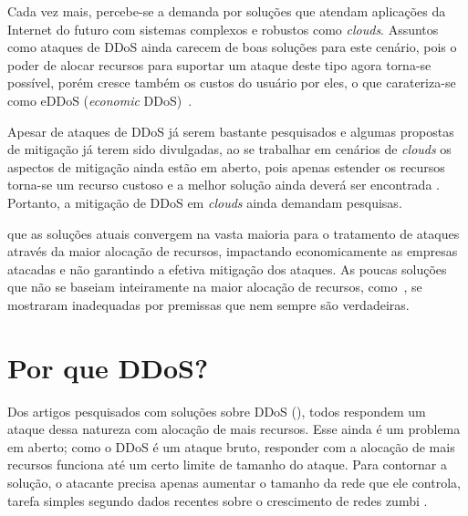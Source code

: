 \documentclass[a4paper, 11pt]{article}
\begin{document}




Cada vez mais, percebe-se a demanda por solu\c{c}\~oes que atendam
aplica\c{c}\~oes da Internet do futuro com sistemas complexos e robustos como
\emph{clouds}. Assuntos como ataques de DDoS ainda carecem de boas
solu\c{c}\~oes para este cen\'ario, pois o poder de
alocar recursos para suportar um ataque deste tipo agora torna-se
poss\'ivel, por\'em cresce tamb\'em os custos do usu\'ario por eles, o que
carateriza-se como eDDoS (\emph{economic} DDoS)~\cite{Soon:10}.
  
Apesar de ataques de DDoS j\'a serem bastante pesquisados e algumas propostas
de mitiga\c{c}\~ao j\'a terem sido divulgadas, ao se trabalhar em cen\'arios de
\emph{clouds} os aspectos de mitiga\c{c}\~ao ainda est\~ao em aberto, pois
apenas estender os recursos torna-se um recurso custoso e a melhor
solu\c{c}\~ao ainda dever\'a ser encontrada . Portanto, a mitiga\c{c}\~ao de
DDoS em \emph{clouds} ainda demandam pesquisas.


que as soluções atuais convergem na vasta maioria para o tratamento de ataques
através da maior alocação de recursos, impactando economicamente as empresas
atacadas e não garantindo a efetiva mitigação dos ataques. As poucas soluções
que não se baseiam inteiramente na maior alocação de recursos,
como~\cite{Soon:10}, se mostraram inadequadas por premissas que nem sempre são
verdadeiras.

\section{Por que DDoS?}
Dos artigos pesquisados com soluções sobre DDoS (\cite{Zhang:11, Zuckerman:10, Soon:10}), todos respondem um ataque dessa natureza com alocação de mais recursos. Esse ainda é um problema em aberto; como o DDoS é um ataque bruto, responder com a alocação de mais recursos funciona até um certo limite de tamanho do ataque. Para contornar a solução, o atacante precisa apenas aumentar o tamanho da rede que ele controla, tarefa simples segundo dados recentes sobre o crescimento de redes zumbi \cite{Chao:09}.
\end{document}
